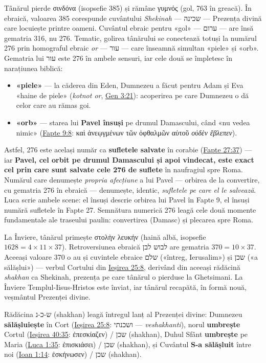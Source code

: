 \documentclass[12pt,a4paper,twoside,openany]{book}
\begin{document}
Tânărul pierde σινδόνα (isopsefie 385) și rămâne γυμνός (gol, 763 în greacă). În ebraică, valoarea 385 corespunde cuvântului \textit{Shekinah} — שכינה — Prezența divină care locuiește printre oameni. Cuvântul ebraic pentru «gol» — ערום — are însă gematria 316, nu 276. Tematic, golirea tânărului se conectează totuși la numărul 276 prin homograful ebraic \textit{or} — עור — care înseamnă simultan «piele» și «orb». Gematria lui עור este 276 în ambele sensuri, iar cele două se împletesc în narațiunea biblică:
\begin{itemize}
  \item \textbf{«piele»} — la căderea din Eden, Dumnezeu a făcut pentru Adam și Eva «haine de piele» (\textit{kotnot or}, \href{https://bibliaortodoxa.ro/carte.php?id=25\&cap=3\#21}{Gen 3:21}): acoperirea pe care Dumnezeu o dă celor care au rămas goi.
  \item \textbf{«orb»} — starea lui \textbf{Pavel însuși} pe drumul Damascului, când «nu vedea nimic» (\href{https://bibliaortodoxa.ro/carte.php?id=26\&cap=9\#8}{Fapte 9:8}: καὶ ἀνεῳγμένων τῶν ὀφθαλμῶν αὐτοῦ \textit{οὐδὲν ἔβλεπεν}).
\end{itemize}
Astfel, 276 este același număr ca \textbf{sufletele salvate} în corabie (\href{https://bibliaortodoxa.ro/carte.php?id=26\&cap=27\#37}{Fapte 27:37}) — iar \textbf{Pavel, cel orbit pe drumul Damascului și apoi vindecat, este exact cel prin care sunt salvate cele 276 de suflete} în naufragiul spre Roma. Numărul care denumește \textit{propria afecțiune} a lui Pavel — orbirea de la convertire, cu gematria 276 în ebraică — denumește, identic, \textit{sufletele pe care el le salvează}. Luca scrie ambele scene: el însuși descrie orbirea lui Pavel în Fapte 9, el însuși numără sufletele în Fapte 27. Semnătura numerică 276 leagă cele două momente fundamentale ale traseului paulin: convertirea (Damasc) și plecarea spre Roma.

La Înviere, tânărul primește στολὴν λευκήν (haină albă, isopsefie $1628 = 4 \times 11 \times 37$). Retroversiunea ebraică לבוש לבן are gematria $370 = 10 \times 37$. Aceeași valoare 370 o au și cuvintele ebraice שלם («întreg, Ierusalim») și שכן («a sălășlui») — verbul Cortului din \href{https://bibliaortodoxa.ro/carte.php?id=32\&cap=25\#8}{Ieșirea 25:8}, derivând din aceeași rădăcină \textit{shakhan} ca Shekinah, prezența pe care tânărul o pierduse la Ghetsimani. La Înviere Templul-Iisus-Hristos este înviat, iar tânărul recapătă, în formă nouă, veșmântul Prezenței divine.

Rădăcina ש-כ-נ (shakhan) leagă întregul lanț al Prezenței divine: Dumnezeu \textbf{sălășluiește} în Cort (\href{https://bibliaortodoxa.ro/carte.php?id=32\&cap=25\#8}{Ieșirea 25:8}: ושכנתי --- \textit{veshakhanti}), norul \textbf{umbrește} Cortul (\href{https://bibliaortodoxa.ro/carte.php?id=32\&cap=40\#35}{Ieșirea 40:35}: ἐπεσκίαζεν) / שכן (shakhan), Duhul Sfânt \textbf{umbrește} pe Maria (\href{https://bibliaortodoxa.ro/carte.php?id=48\&cap=1\#35}{Luca 1:35}: ἐπισκιάσει) / שכן (shakhan), și Cuvântul \textbf{S-a sălășluit} între noi (\href{https://bibliaortodoxa.ro/carte.php?id=35\&cap=1\#14}{Ioan 1:14}: ἐσκήνωσεν) / שכן (shakhan).
\end{document}

